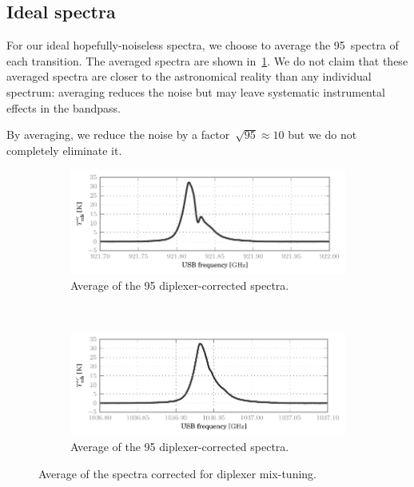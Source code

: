 
\subsection{Ideal spectra}
For our ideal hopefully-noiseless spectra, we choose to average the 95~spectra of each transition.
The averaged spectra are shown in~\cref{fig:corrected_averaged}.
We do not claim that these averaged spectra are closer to the astronomical reality than any individual spectrum: averaging reduces the noise but may leave systematic instrumental effects in the bandpass.

By averaging, we reduce the noise by a factor~$\sqrt{95} \approx 10$ but we do not completely eliminate it.

\begin{figure}
    \centering
    \begin{subfigure}[b]{\textwidth}
        \centering
        \includegraphics{87_avera_corrected_tmb}
        \vspace{-.8em}
        \caption{Average of the 95  diplexer-corrected spectra.}
    \end{subfigure}
    \\
    \begin{subfigure}[b]{\textwidth}
        \centering
        \includegraphics{98_avera_corrected_tmb}
        \vspace{-.8em}
        \caption{Average of the 95  diplexer-corrected spectra.}
    \end{subfigure}
    \caption{Average of the spectra corrected for diplexer mix-tuning.}
    \label{fig:corrected_averaged}
\end{figure}

